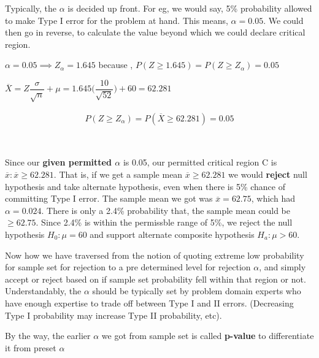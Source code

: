 \documentclass[float=false,crop=false]{standalone}
\begin{document}
Typically, the \(\alpha\) is decided up front. For eg, we would say, 5\%
probability allowed to make Type I error for the problem at hand. This
means, \(\alpha = 0.05\). We could then go in reverse, to calculate the
value beyond which we could declare critical region.

\(\alpha = 0.05 \implies Z_{\alpha} = 1.645\) because ,
\(P(Z \geq 1.645) = P(Z \geq Z_{\alpha}) = 0.05\)

\(\overline{X} = Z\dfrac{\sigma}{\sqrt{n}} + \mu = 1.645\Big(\dfrac{10}{\sqrt{52}}\Big) + 60 = 62.281\)

\begin{equation}
    \begin{aligned}
    P(Z \geq Z_{\alpha}) = P(\overline{X} \geq 62.281) = 0.05 \label{eq:002}
    \end{aligned}
\end{equation}
    \begin{center}
    \end{center}
    { \hspace*{\fill} \\}
    
    Since our \textbf{given permitted \(\alpha\)} is 0.05, our permitted
critical region C is \(\overline{x}:\overline{x} \geq 62.281\). That is,
if we get a sample mean \(\overline{x} \geq 62.281\) we would
\textbf{reject} null hypothesis and take alternate hypothesis, even when
there is 5\% chance of committing Type I error. The sample mean we got
was \(\overline{x} = 62.75\), which had \(\alpha = 0.024\). There is
only a 2.4\% probability that, the sample mean could be \(\geq 62.75\).
Since 2.4\% is within the permissble range of 5\%, we reject the null
hypothesis \(H_0:\mu=60\) and support alternate composite hypothesis
\(H_a:\mu>60\).

Now how we have traversed from the notion of quoting extreme low
probability for sample set for rejection to a pre determined level for
rejection \(\alpha\), and simply accept or reject based on if sample set
probability fell within that region or not. Understandably, the
\(\alpha\) should be typically set by problem domain experts who have
enough expertise to trade off between Type I and II errors. (Decreasing
Type I probability may increase Type II probability, etc).

By the way, the earlier \(\alpha\) we got from sample set is called
\textbf{p-value} to differentiate it from preset \(\alpha\)
\end{document}
